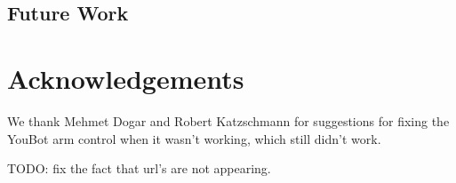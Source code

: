 \documentclass[conference]{acmsiggraph}
\begin{document}
\subsection{Future Work}



\section*{Acknowledgements}

We thank Mehmet Dogar and Robert Katzschmann for suggestions for fixing the YouBot arm control when it wasn't working, which still didn't work.






TODO: fix the fact that url's are not appearing.
\end{document}
